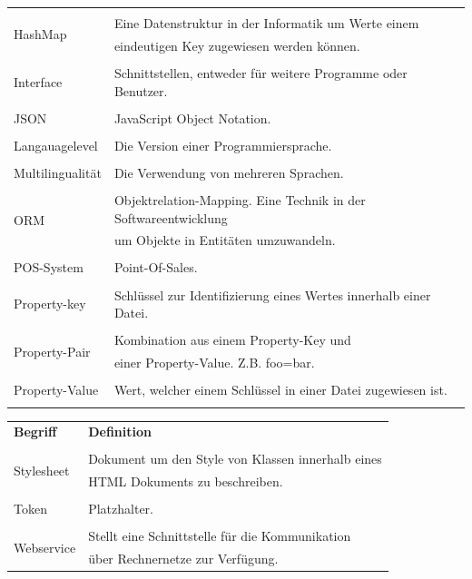 \documentclass[10pt, oneside, ngerman]{article}
\begin{document}
\begin{tabular}{p{} l}
    & \\
    \multirow{2}{*}{HashMap} & Eine Datenstruktur in der Informatik um Werte einem \\ & eindeutigen Key zugewiesen werden können.\\
    & \\
    Interface & Schnittstellen, entweder für weitere Programme oder Benutzer.\\
    & \\
    JSON & JavaScript Object Notation.\\
    & \\
    Langauagelevel & Die Version einer Programmiersprache.\\
    & \\
    Multilingualität & Die Verwendung von mehreren Sprachen.\\
    & \\
    \multirow{2}{*}{ORM} & Objektrelation-Mapping. Eine Technik in der Softwareentwicklung\\ & um Objekte in Entitäten umzuwandeln.\\
    & \\
    POS-System & Point-Of-Sales.\\
    & \\
    Property-key & Schlüssel zur Identifizierung eines Wertes innerhalb einer Datei.\\
    & \\
    \multirow{2}{*}{Property-Pair} & Kombination aus einem Property-Key und \\ & einer Property-Value. Z.B. foo=bar.\\
    & \\
    Property-Value & Wert, welcher einem Schlüssel in einer Datei zugewiesen ist.\\
    & \\
  \end{tabular}
  \begin{tabular}{p{} l}
    \textbf{Begriff} & \textbf{Definition}\\
    & \\
    \multirow{2}{*}{Stylesheet} & Dokument um den Style von Klassen innerhalb eines \\ &HTML Dokuments zu beschreiben.\\
    & \\
    Token  & Platzhalter.\\
    & \\
    \multirow{2}{*}{Webservice} & Stellt eine Schnittstelle für die Kommunikation \\ & über Rechnernetze zur Verfügung.\\
  \end{tabular}
  \newpage
\end{document}
